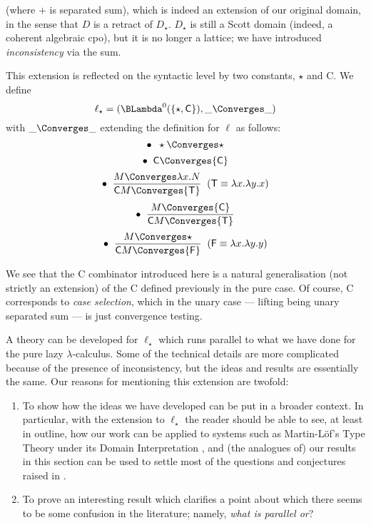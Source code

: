 (where $+$ is separated sum), which is indeed an extension of our original domain, in the sense that $D$ is a retract of $D_{\star}$. 
$D_{\star}$ is still a Scott domain (indeed, a coherent algebraic cpo), but it is no longer a lattice; 
we have introduced {\em inconsistency} via the sum.

This extension is reflected on the syntactic level by two constants, $\star$ and {\sf C}. We define
\[ \ell_{\star} = (\BLambda^{0} ( \{ \star , {\sf C} \} ), \_ \Converges \_ ) \]
with $\_ \Converges \_$ extending the definition for $\ell$ as follows:
\[ \bullet \;\; \star \Converges \star \]
\[ \bullet \;\; {\sf C} \Converges {\sf C} \]
\[ \bullet \;\; \frac{M \Converges \lambda x . N}{{\sf C} M \Converges {\sf T}} \;\; ({\sf T} \equiv \lambda x . \lambda y . x ) \]
\[ \bullet \;\; \frac{M \Converges {\sf C}}{{\sf C} M \Converges {\sf T}} \]
\[ \bullet \;\; \frac{M \Converges \star}{{\sf C} M \Converges {\sf F}} \;\; ({\sf F} \equiv \lambda x . \lambda y . y ) \]

We see that the {\sf C} combinator introduced here is a natural generalisation 
(not strictly an extension) of the {\sf C} defined previously in the pure case. 
Of course, {\sf C} corresponds to {\em case selection}, which in the unary case --- lifting being unary separated sum --- is just convergence testing.

A theory can be developed for $\ell_{\star}$ which runs parallel to what we have done for the pure lazy $\lambda$-calculus. 
Some of the technical details are more complicated because of the presence of inconsistency, but the ideas and results are essentially the same. 
Our reasons for mentioning this extension are twofold:

\begin{enumerate}

\item To show how the ideas we have developed can be put in a broader context. 
In particular, with the extension to $\ell_{\star}$  the reader should be able to see, at least in outline, 
how our work can be applied to systems such as Martin-L\"{o}f's Type Theory 
under its Domain Interpretation \cite{Cha83}, and (the analogues of) our 
results in this section can be used to settle most of the questions and conjectures raised in \cite{Cha83}.

\item To prove an interesting result which clarifies a point about which there seems to be some confusion in the literature; 
namely, {\em what is parallel or}? 
\end{enumerate}

